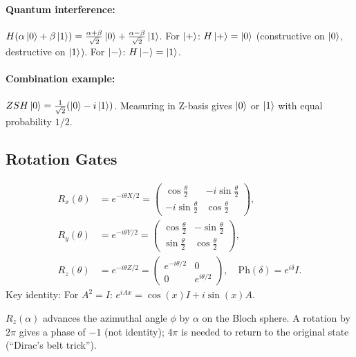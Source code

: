\documentclass[10pt,a4paper]{article}
\begin{document}
\paragraph{Quantum interference:} $H(\alpha\ket{0}+\beta\ket{1})=\frac{\alpha+\beta}{\sqrt{2}}\ket{0}+\frac{\alpha-\beta}{\sqrt{2}}\ket{1}$. For $\ket{+}$: $H\ket{+}=\ket{0}$ (constructive on $\ket{0}$, destructive on $\ket{1}$). For $\ket{-}$: $H\ket{-}=\ket{1}$.

\paragraph{Combination example:} $ZSH\ket{0}=\frac{1}{\sqrt{2}}(\ket{0}-i\ket{1})$. Measuring in Z-basis gives $\ket{0}$ or $\ket{1}$ with equal probability $1/2$.

\subsection{Rotation Gates}

\begin{tcolorbox}[defstyle, title={Definition: Rotation Gates}]
\begin{align*}
R_x(\theta) &= e^{-i\theta X/2} = \begin{pmatrix}\cos\frac{\theta}{2}&-i\sin\frac{\theta}{2}\\-i\sin\frac{\theta}{2}&\cos\frac{\theta}{2}\end{pmatrix}, \\
R_y(\theta) &= e^{-i\theta Y/2} = \begin{pmatrix}\cos\frac{\theta}{2}&-\sin\frac{\theta}{2}\\\sin\frac{\theta}{2}&\cos\frac{\theta}{2}\end{pmatrix}, \\
R_z(\theta) &= e^{-i\theta Z/2} = \begin{pmatrix}e^{-i\theta/2}&0\\0&e^{i\theta/2}\end{pmatrix},\quad \mathrm{Ph}(\delta)=e^{i\delta}I.
\end{align*}
Key identity: For $A^2=I$: $e^{iAx}=\cos(x)I+i\sin(x)A$.
\end{tcolorbox}

$R_z(\alpha)$ advances the azimuthal angle $\phi$ by $\alpha$ on the Bloch sphere. A rotation by $2\pi$ gives a phase of $-1$ (not identity); $4\pi$ is needed to return to the original state (``Dirac's belt trick'').
\end{document}
